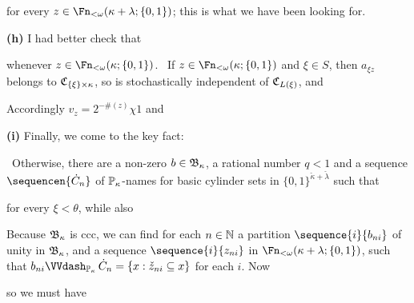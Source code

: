 {\noindent for every $z\in\Fn_{<\omega}(\kappa+\lambda;\{0,1\})$;
this is what we have been looking for.\ \Qed

\medskip

{\bf (h)} I had better check that


\noindent whenever $z\in\Fn_{<\omega}(\kappa;\{0,1\})$.
\Prf\ If $z\in\Fn_{<\omega}(\kappa;\{0,1\})$ and
$\xi\in S$,
then $a_{\xi z}$ belongs to $\frak C_{\{\xi\}\times\kappa}$, so is
stochastically independent of $\frak C_{L(\xi)}$, and


\noindent Accordingly
$v_z=2^{-\#(z)}\chi 1$ and


\medskip

{\bf (i)} Finally, we come to the key fact:


\noindent\Prf\Quer\ Otherwise, there are a non-zero $b\in\frak B_{\kappa}$,
a rational number $q<1$ and a sequence $\sequencen{\dot C_n}$ of
$\Bbb P_{\kappa}$-names for basic cylinder sets in
$\{0,1\}^{\check\kappa+\check\lambda}$ such that


\noindent for every $\xi<\theta$, while also


\noindent Because $\frak B_{\kappa}$ is ccc, we can find for each
$n\in\Bbb N$ a partition $\sequence{i}{b_{ni}}$ of unity in
$\frak B_{\kappa}$, and a sequence
$\sequence{i}{z_{ni}}$ in $\Fn_{<\omega}(\kappa+\lambda;\{0,1\})$, such
that $b_{ni}\VVdPk\,\dot C_n=\{x:\check z_{ni}\subseteq x\}$ for each $i$.
Now


\noindent so we must have

}
